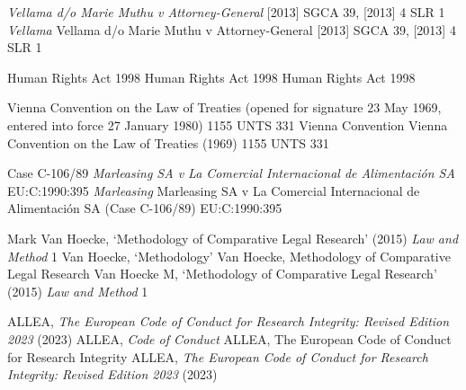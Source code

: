 %

  {\textit{Vellama d/o Marie Muthu v Attorney-General} [2013] SGCA 39, [2013] 4 SLR 1}
  {\textit{Vellama}}
  {Vellama d/o Marie Muthu v Attorney-General [2013] SGCA 39, [2013] 4 SLR 1}
  {}

  {Human Rights Act 1998}
  {Human Rights Act 1998}
  {Human Rights Act 1998}
  {}

  {Vienna Convention on the Law of Treaties (opened for signature 23 May 1969, entered into force 27 January 1980) 1155 UNTS 331}
  {Vienna Convention}
  {Vienna Convention on the Law of Treaties (1969) 1155 UNTS 331}
  {}

  {Case C-106/89 \textit{Marleasing SA v La Comercial Internacional de Alimentaci\'{o}n SA} EU:C:1990:395}
  {\textit{Marleasing}}
  {Marleasing SA v La Comercial Internacional de Alimentaci\'{o}n SA (Case C-106/89) EU:C:1990:395}
  {}

  {Mark Van Hoecke, `Methodology of Comparative Legal Research' (2015) \textit{Law and Method} 1}
  {Van Hoecke, `Methodology'}
  {Van Hoecke, Methodology of Comparative Legal Research}
  {Van Hoecke M, `Methodology of Comparative Legal Research' (2015) \textit{Law and Method} 1}

  {ALLEA, \textit{The European Code of Conduct for Research Integrity: Revised Edition 2023} (2023)}
  {ALLEA, \textit{Code of Conduct}}
  {ALLEA, The European Code of Conduct for Research Integrity}
  {ALLEA, \textit{The European Code of Conduct for Research Integrity: Revised Edition 2023} (2023)}
